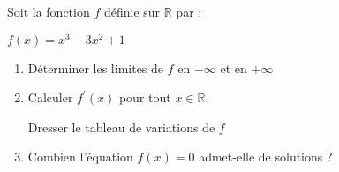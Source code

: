 
%
Soit la fonction $f$ définie sur $\mathbb{R}$ par :
\begin{center}$f\left(x\right)=x^{3}-3x^{2}+1$\end{center}
\begin{enumerate}
     \item
     Déterminer les limites de $f$ en $-\infty $ et en $+\infty $
     \item
     Calculer $f^{\prime}\left(x\right)$ pour tout $x \in  \mathbb{R}$.
     \par
     Dresser le tableau de variations de $f$
     \item
     Combien l'équation $f\left(x\right)=0$ admet-elle de solutions ?
\end{enumerate}
